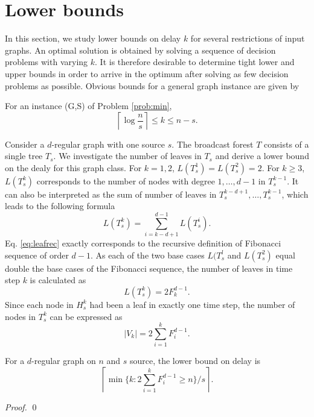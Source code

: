 

\section{Lower bounds}
In this section, we study lower bounds on delay $k$ for several restrictions of input graphs.
An optimal solution is obtained by solving a sequence of decision problems with varying $k$. 
It is therefore desirable to determine tight lower and upper bounds in order to arrive in the optimum after solving as few decision problems as possible.
Obvious bounds for a general graph instance are given by
\begin{observation}
For an instance (G,S) of Problem \ref{prob:min},
$$\left\lceil\log\frac{n}{s}\right\rceil\leq k \leq n-s.$$
\end{observation}

Consider a $d$-regular graph with one source $s$.
The broadcast forest $T$ consists of a single tree $T_s$.
We investigate the number of leaves in $T_s$ and derive a lower bound on the dealy for this graph class.
For $k=1,2$, $L(T^1_s)=L(T^2_s)=2$.
For $k\geq 3$, $L(T^k_s)$ corresponds to the number of nodes with degree $1,\dots,d-1$ in $T^{k-1}_s$.
It can also be interpreted as the sum of number of leaves in $T^{k-d+1}_s,\dots,T^{k-1}_s$, which leads to the following formula
\begin{equation}
\label{eq:leafrec}
L(T^k_s)=\sum\limits_{i=k-d+1}^{d-1} L(T^i_s).
\end{equation}  
Eq. \eqref{eq:leafrec} exactly corresponds to the recursive definition of Fibonacci sequence of order $d-1$.
As each of the two base cases $L(T^l_s$ and $L(T^2_s)$ equal double the base cases of the Fibonacci sequence, the number of leaves in time step $k$ is calculated as
\begin{equation}
\label{eq:fibleaf}
L(T^k_s)=2 F^{d-1}_k.
\end{equation}  
Since each node in $H^k_s$ had been a leaf in exactly one time step, the number of nodes in $T^k_s$ can be expressed as 
\begin{equation}
\label{eq:fibcnt}
|V_k|=2\sum\limits_{i=1}^k F^{d-1}_i.
\end{equation}

\begin{proposition}
For a $d$-regular graph on $n$ and $s$ source, the lower bound on delay is 
\begin{equation}
\label{lem:lbreg1}
\left\lceil\min\{k:2\sum\limits_{i=1}^k F^{d-1}_i\geq n\}/s\right\rceil.
\end{equation}
\end{proposition}
\begin{proof}
\qed
\end{proof}

